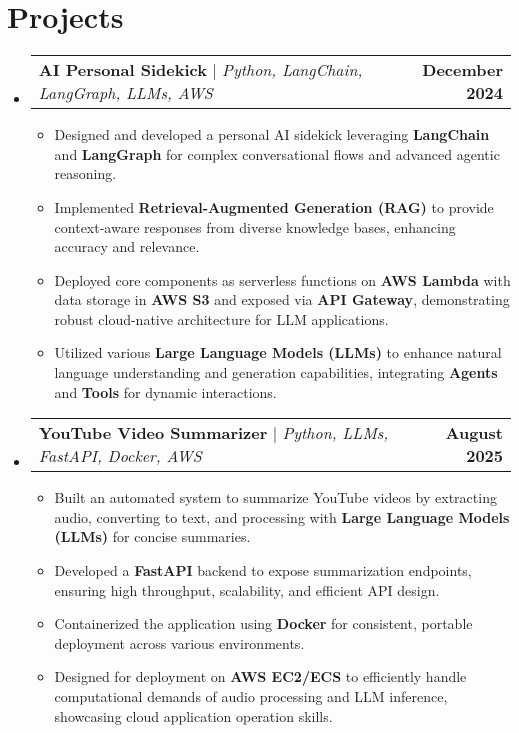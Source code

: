 \documentclass[letterpaper,11pt]{article}
\makeatletter
\newcommand{\resumeItem}[1]{
  \item\small{
    {#1 \vspace{-2pt}}
  }
}
\newcommand{\resumeProjectHeading}[2]{
    \item
    \begin{tabular*}{1.001\textwidth}{l@{\extracolsep{\fill}}r}
      \small#1 & \textbf{\small #2}\\
    \end{tabular*}\vspace{-7pt}
}
\newcommand{\resumeSubHeadingListStart}{\begin{itemize}[leftmargin=0.0in, label={}]}
\newcommand{\resumeSubHeadingListEnd}{\end{itemize}}
\newcommand{\resumeItemListStart}{\begin{itemize}}
\newcommand{\resumeItemListEnd}{\end{itemize}\vspace{-5pt}}
\makeatother
\begin{document}
\section{Projects}
    \vspace{-5pt}
    \resumeSubHeadingListStart
      \resumeProjectHeading
          {\textbf{AI Personal Sidekick} $|$ \emph{Python, LangChain, LangGraph, LLMs, AWS}}{December 2024}
          \resumeItemListStart
            \resumeItem{Designed and developed a personal AI sidekick leveraging \textbf{LangChain} and \textbf{LangGraph} for complex conversational flows and advanced agentic reasoning.}
            \resumeItem{Implemented \textbf{Retrieval-Augmented Generation (RAG)} to provide context-aware responses from diverse knowledge bases, enhancing accuracy and relevance.}
            \resumeItem{Deployed core components as serverless functions on \textbf{AWS Lambda} with data storage in \textbf{AWS S3} and exposed via \textbf{API Gateway}, demonstrating robust cloud-native architecture for LLM applications.}
            \resumeItem{Utilized various \textbf{Large Language Models (LLMs)} to enhance natural language understanding and generation capabilities, integrating \textbf{Agents} and \textbf{Tools} for dynamic interactions.}
          \resumeItemListEnd
          \vspace{-13pt}
      \resumeProjectHeading
          {\textbf{YouTube Video Summarizer} $|$ \emph{Python, LLMs, FastAPI, Docker, AWS}}{August 2025}
          \resumeItemListStart
            \resumeItem{Built an automated system to summarize YouTube videos by extracting audio, converting to text, and processing with \textbf{Large Language Models (LLMs)} for concise summaries.}
            \resumeItem{Developed a \textbf{FastAPI} backend to expose summarization endpoints, ensuring high throughput, scalability, and efficient API design.}
            \resumeItem{Containerized the application using \textbf{Docker} for consistent, portable deployment across various environments.}
            \resumeItem{Designed for deployment on \textbf{AWS EC2/ECS} to efficiently handle computational demands of audio processing and LLM inference, showcasing cloud application operation skills.}
          \resumeItemListEnd 
    \resumeSubHeadingListEnd
\vspace{-14pt}


%
\end{document}
